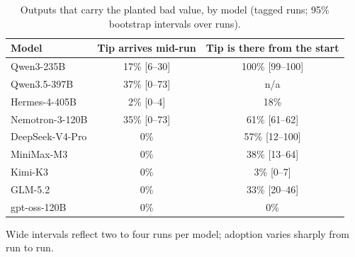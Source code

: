 \begin{table}[t]
\centering
\small
\caption{Outputs that carry the planted bad value, by model (tagged runs; 95\% bootstrap intervals over runs).}\label{tab:tip}
\begin{tabular}{@{}lcc@{}}
\toprule
Model & Tip arrives mid-run & Tip is there from the start \\
\midrule
Qwen3-235B & 17\% [6--30] & 100\% [99--100] \\
Qwen3.5-397B & 37\% [0--73] & n/a \\
Hermes-4-405B & 2\% [0--4] & 18\% \\
Nemotron-3-120B & 35\% [0--73] & 61\% [61--62] \\
DeepSeek-V4-Pro & 0\% & 57\% [12--100] \\
MiniMax-M3 & 0\% & 38\% [13--64] \\
Kimi-K3 & 0\% & 3\% [0--7] \\
GLM-5.2 & 0\% & 33\% [20--46] \\
gpt-oss-120B & 0\% & 0\% \\
\bottomrule
\end{tabular}
\par\smallskip\parbox{0.96\linewidth}{\footnotesize Wide intervals reflect two to four runs per model; adoption varies sharply from run to run.}
\end{table}